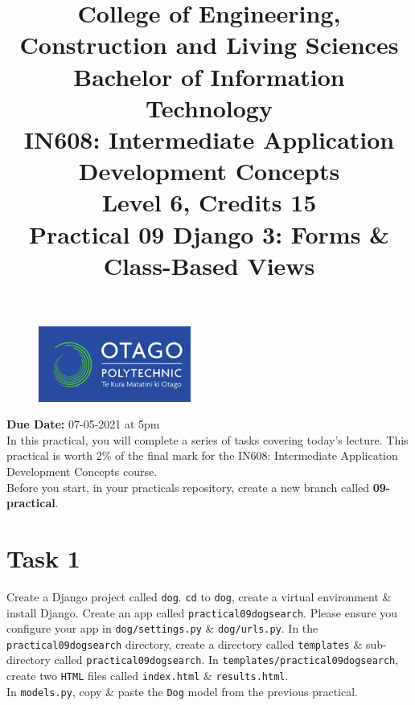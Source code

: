 \documentclass{article}
\author{}
\begin{document}
\begin{figure}
	\centering
	\includegraphics[width=50mm]{./img/logo.png}
\end{figure}

\title{College of Engineering, Construction and Living Sciences\\Bachelor of Information Technology\\IN608: Intermediate Application Development Concepts\\Level 6, Credits 15\\\textbf{Practical 09 Django 3: Forms \& Class-Based Views}} 
\date{}
\maketitle

\textbf{Due Date:} 07-05-2021 at 5pm \\

In this practical, you will complete a series of tasks covering today's lecture. This practical is worth 2\% of the final mark for the IN608: Intermediate Application Development Concepts course. \\

Before you start, in your practicals repository, create a new branch called \textbf{09-practical}.

\section*{Task 1} 
Create a Django project called \texttt{dog}. \texttt{cd} to \texttt{dog}, create a virtual environment \& install Django. Create an app called \texttt{practical09dogsearch}. Please ensure you configure your app in \texttt{dog/settings.py} \& \texttt{dog/urls.py}. In the \texttt{practical09dogsearch} directory, create a directory called \texttt{templates} \& sub-directory called \texttt{practical09dogsearch}. In \texttt{templates/practical09dogsearch}, create two \texttt{HTML} files called \texttt{index.html} \& \texttt{results.html}. \\

In \texttt{models.py}, copy \& paste the \texttt{Dog} model from the previous practical. \\
\end{document}
